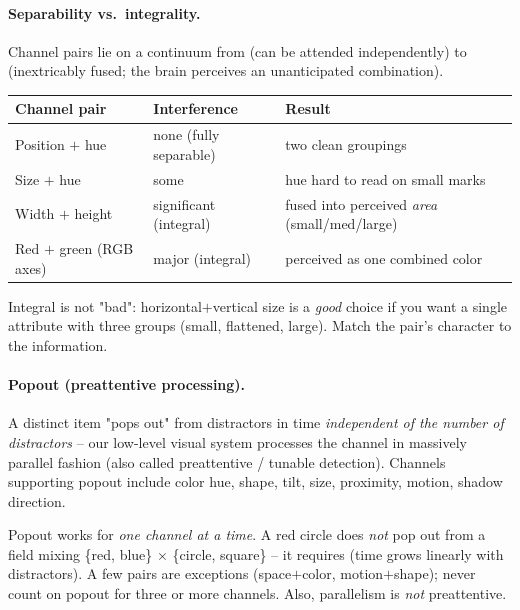 \paragraph{Separability vs.\ integrality.} Channel pairs lie on a continuum from
 (can be attended independently) to 
(inextricably fused; the brain perceives an unanticipated combination).

\begin{center}
\begin{tabular}{@{}l l l@{}}
\toprule
Channel pair & Interference & Result \\
\midrule
Position $+$ hue            & none (fully separable) & two clean groupings \\
Size $+$ hue                & some                   & hue hard to read on small marks \\
Width $+$ height            & significant (integral) & fused into perceived \emph{area} (small/med/large) \\
Red $+$ green (RGB axes)    & major (integral)       & perceived as one combined color \\
\bottomrule
\end{tabular}
\end{center}

\noindent Integral is not "bad": horizontal$+$vertical size is a \emph{good}
choice if you want a single attribute with three groups (small, flattened,
large). Match the pair's character to the information.

\paragraph{Popout (preattentive processing).} A distinct item "pops out" from
distractors in time \emph{independent of the number of distractors} -- our
low-level visual system processes the channel in massively parallel fashion
(also called preattentive / tunable detection). Channels supporting popout
include color hue, shape, tilt, size, proximity, motion, shadow direction.
\begin{pitfall}
Popout works for \emph{one channel at a time}. A red circle does \emph{not} pop
out from a field mixing \{red, blue\} $\times$ \{circle, square\} -- it requires
 (time grows linearly with distractors). A few pairs are
exceptions (space$+$color, motion$+$shape); never count on popout for three or
more channels. Also, parallelism is \emph{not} preattentive.
\end{pitfall}

